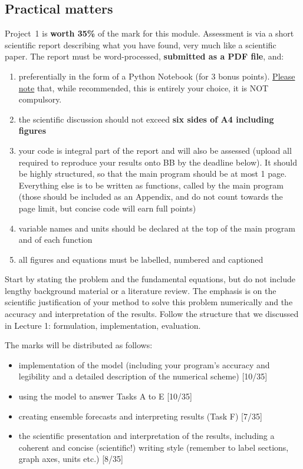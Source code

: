 \documentclass[11pt,a4paper]{article}
\begin{document}
\pagebreak
\subsection*{Practical matters}
Project~1 is \textbf{worth 35\%} of the mark for this module. Assessment is via a short scientific report describing what you have found, very much like a scientific paper.  The report must be word-processed, {\bf submitted as a PDF file}, and:
\begin{enumerate}
	\item{preferentially in the form of a Python Notebook (for 3 bonus points). \underline {Please note} that, while recommended, this is entirely your choice, it is NOT compulsory.} 
	\item{the scientific discussion should not exceed {\bf six sides of A4 including figures}}
	\item{your code is integral part of the report and will also be assessed (upload all required to reproduce your results onto BB by the deadline below). It should be highly structured, so that the main program should be at most 1 page. Everything else is to be written as functions, called by the main program (those should be included as an Appendix, and do not count towards the page limit, but concise code will earn full points)}
	\item{variable names and units should be declared at the top of the main program and of each function}
	\item{all figures and equations must be labelled, numbered and captioned}
\end{enumerate} 

Start by stating the problem and the fundamental equations, but do not include lengthy background material or
a literature review. The emphasis is on the scientific justification
of your method to solve this problem numerically and the accuracy and
interpretation of the results. Follow the structure that we discussed in Lecture 1: formulation, implementation, evaluation.

The marks will be distributed as follows:
\begin{itemize}
	\item implementation of the model (including your program's accuracy and legibility and a detailed description of the numerical scheme) [10/35]
	\item using the model to answer Tasks A to E [10/35]
	\item creating ensemble forecasts and interpreting results (Task F) [7/35]
	\item the scientific presentation and interpretation of the results,  including a coherent and concise (scientific!) writing style (remember to label sections, graph axes, units etc.) [8/35]
\end{itemize}
\end{document}
